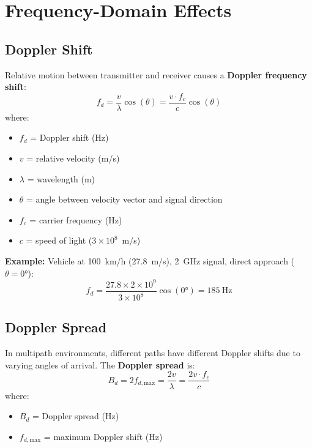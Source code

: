 \section{Frequency-Domain Effects}

\subsection{Doppler Shift}

Relative motion between transmitter and receiver causes a \textbf{Doppler frequency shift}:
\begin{equation}
f_d = \frac{v}{\lambda} \cos(\theta) = \frac{v \cdot f_c}{c} \cos(\theta)
\end{equation}
where:
\begin{itemize}
\item $f_d$ = Doppler shift (Hz)
\item $v$ = relative velocity (m/s)
\item $\lambda$ = wavelength (m)
\item $\theta$ = angle between velocity vector and signal direction
\item $f_c$ = carrier frequency (Hz)
\item $c$ = speed of light ($3 \times 10^8$~m/s)
\end{itemize}

\textbf{Example:} Vehicle at 100~km/h (27.8~m/s), 2~GHz signal, direct approach ($\theta = 0°$):
\begin{equation}
f_d = \frac{27.8 \times 2 \times 10^9}{3 \times 10^8} \cos(0°) = 185~\text{Hz}
\end{equation}

\subsection{Doppler Spread}

In multipath environments, different paths have different Doppler shifts due to varying angles of arrival. The \textbf{Doppler spread} is:
\begin{equation}
B_d = 2f_{d,\text{max}} = \frac{2v}{\lambda} = \frac{2v \cdot f_c}{c}
\end{equation}
where:
\begin{itemize}
\item $B_d$ = Doppler spread (Hz)
\item $f_{d,\text{max}}$ = maximum Doppler shift (Hz)
\end{itemize}

